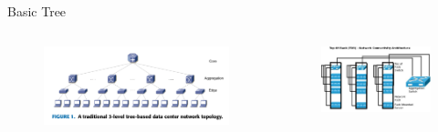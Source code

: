 \documentclass[aspectratio=169]{beamer}
\begin{document}
     \begin{frame} {Basic Tree}
        
        \begin{columns}    
                       
            \begin{figure}[ht]    
                \includegraphics[scale=0.3]{basic_tree.png}
                
               
                \label{fig:consumo}
            \end{figure}
	
          \begin{figure}[ht]    
              \includegraphics[scale=0.25]{imagens/tor.jpeg}
              
             
              \label{fig:consumo}
          \end{figure}
        \end{columns}
     		
     \end{frame}
     
\end{document}
